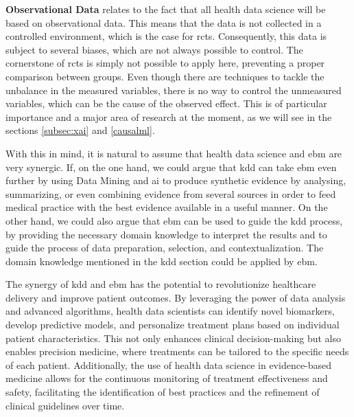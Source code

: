 \textbf{Observational Data} relates to the fact that all health data science will be based on observational data. This means that the data is not collected in a controlled environment, which is the case for \acp{rct}. Consequently, this data is subject to several biases, which are not always possible to control. The cornerstone of \acp{rct} is simply not possible to apply here, preventing a proper comparison between groups. Even though there are techniques to tackle the unbalance in the measured variables, there is no way to control the unmeasured variables, which can be the cause of the observed effect. This is of particular importance and a major area of research at the moment, as we will see in the sections \ref{subsec:xai} and \ref{causalml}.

With this in mind, it is natural to assume that health data science and \ac{ebm} are very synergic. If, on the one hand, we could argue that \ac{kdd} can take \ac{ebm} even further by using Data Mining and \ac{ai} to produce synthetic evidence by analysing, summarizing, or even combining evidence from several sources in order to feed medical practice with the best evidence available in a useful manner. On the other hand, we could also argue that \ac{ebm} can be used to guide the \ac{kdd} process, by providing the necessary domain knowledge to interpret the results and to guide the process of data preparation, selection, and contextualization. The domain knowledge mentioned in the \ac{kdd} section could be applied by \ac{ebm}.

The synergy of \ac{kdd} and \ac{ebm} has the potential to revolutionize healthcare delivery and improve patient outcomes. By leveraging the power of data analysis and advanced algorithms, health data scientists can identify novel biomarkers, develop predictive models, and personalize treatment plans based on individual patient characteristics. This not only enhances clinical decision-making but also enables precision medicine, where treatments can be tailored to the specific needs of each patient. Additionally, the use of health data science in evidence-based medicine allows for the continuous monitoring of treatment effectiveness and safety, facilitating the identification of best practices and the refinement of clinical guidelines over time.
